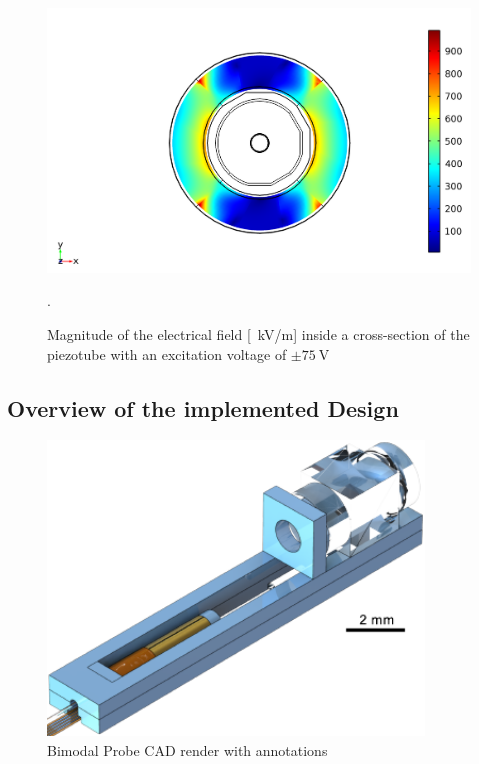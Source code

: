 \begin{figure}[h!]\centering
      \includegraphics[width=10 cm]{figures/30_DesignSimulation/Mechanical/field.png}
      \caption{Magnitude of the electrical field [\SI{}{\kilo \volt / \meter}] inside a cross-section of the piezotube with an excitation voltage of $\pm \SI{75}{\volt}$}.
      \label{fig:field}
\end{figure}


\newpage
\subsection{Overview of the implemented Design}
\begin{figure}[h!]\centering 
\includegraphics[width=10cm]{figures/30_DesignSimulation/Overview/BimodalBenchDoubleLens.pdf}
      \caption{Bimodal Probe CAD render with annotations}
\end{figure}


